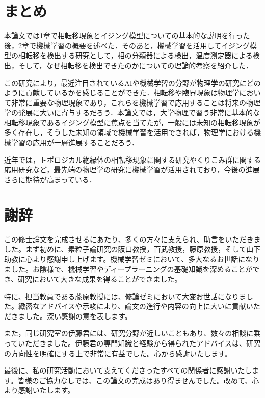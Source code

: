 \documentclass[a4paper,11pt]{jsreport}
\begin{document}
\chapter*{まとめ}
本論文では1章で相転移現象とイジング模型についての基本的な説明を行った後，2章で機械学習の概要を述べた．そのあと，機械学習を活用してイジング模型の相転移を検出する研究として，相の分類器による検出，温度測定器による検出，そして，なぜ相転移を検出できたのかについての理論的考察を紹介した．\par
この研究により，最近注目されているAIや機械学習の分野が物理学の研究にどのように貢献しているかを感じることができた．相転移や臨界現象は物理学において非常に重要な物理現象であり，これらを機械学習で応用することは将来の物理学の発展に大いに寄与するだろう．本論文では，大学物理で習う非常に基本的な相転移現象であるイジング模型に焦点を当てたが，一般には未知の相転移現象が多く存在し，そうした未知の領域で機械学習を活用できれば，物理学における機械学習の応用が一層進展することだろう．\par
近年では，トポロジカル絶縁体の相転移現象に関する研究やくりこみ群に関する応用研究など，最先端の物理学の研究に機械学習が活用されており，今後の進展さらに期待が高まっている．
\chapter*{謝辞} %

この修士論文を完成させるにあたり、多くの方々に支えられ、助言をいただきました。まず初めに、素粒子論研究の阪口教授，百武教授，藤原教授，そして山下助教に心より感謝申し上げます。機械学習ゼミにおいて、多大なるお世話になりました。お陰様で、機械学習やディープラーニングの基礎知識を深めることができ、研究において大きな成果を得ることができました。\par
特に、担当教員である藤原教授には、修論ゼミにおいて大変お世話になりました。緻密なアドバイスや示唆により、論文の進行や内容の向上に大いに貢献いただきました。深い感謝の意を表します。\par
また，同じ研究室の伊藤君には、研究分野が近しいこともあり、数々の相談に乗っていただきました。伊藤君の専門知識と経験から得られたアドバイスは、研究の方向性を明確にする上で非常に有益でした。心から感謝いたします。\par
最後に、私の研究活動において支えてくださったすべての関係者に感謝いたします。皆様のご協力なしでは、この論文の完成はあり得ませんでした。改めて、心より感謝いたします。
\end{document}
